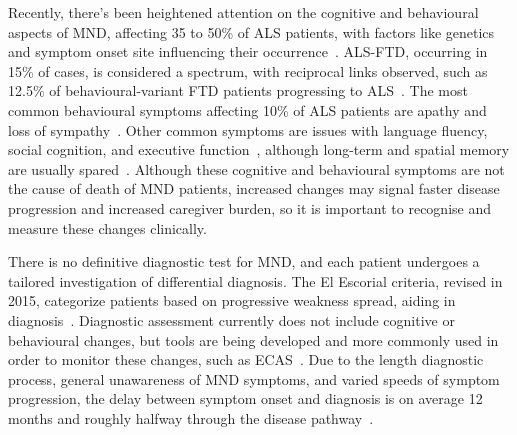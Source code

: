 Recently, there's been heightened attention on the cognitive and behavioural aspects of MND, affecting 35 to 50\% of ALS patients, with factors like genetics and symptom onset site influencing their occurrence~\cite{yangRiskFactorsCognitive2021, chioALSPhenotypeInfluenced2020}.
ALS-FTD, occurring in 15\% of cases, is considered a spectrum, with reciprocal links observed, such as 12.5\% of behavioural-variant FTD patients progressing to ALS~\cite{strongAmyotrophicLateralSclerosis2017}.
The most common behavioural symptoms affecting 10\% of ALS patients are apathy and loss of sympathy~\cite{abrahamsScreeningCognitionBehaviour2014}.
Other common symptoms are issues with language fluency, social cognition, and executive function~\cite{beeldmanCognitiveProfileALS2016}, although long-term and spatial memory are usually spared~\cite{crockfordALSspecificCognitiveBehavior2018}.
Although these cognitive and behavioural symptoms are not the cause of death of MND patients, increased changes may signal faster disease progression and increased caregiver burden, so it is important to recognise and measure these changes clinically.

There is no definitive diagnostic test for MND, and each patient undergoes a tailored investigation of differential diagnosis.
The El Escorial criteria, revised in 2015, categorize patients based on progressive weakness spread, aiding in diagnosis~\cite{ludolphRevisionEscorialCriteria2015}.
Diagnostic assessment currently does not include cognitive or behavioural changes, but tools are being developed and more commonly used in order to monitor these changes, such as ECAS~\cite{abrahamsScreeningCognitionBehaviour2014}.
Due to the length diagnostic process, general unawareness of MND symptoms, and varied speeds of symptom progression, the delay between symptom onset and diagnosis is on average 12 months and roughly halfway through the disease pathway~\cite{mitchellTimelinesDiagnosticEvaluation2010}.

